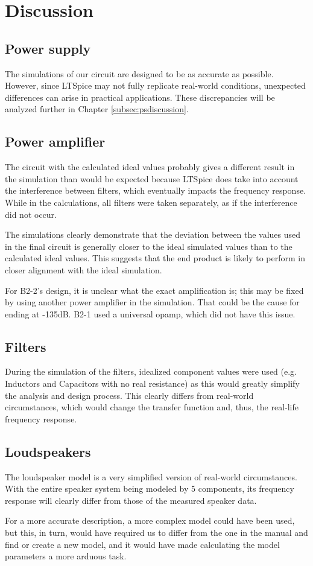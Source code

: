 \section{Discussion}

\subsection{Power supply}
The simulations of our circuit are designed to be as accurate as possible. However, since LTSpice may not fully replicate real-world conditions, unexpected differences can arise in practical applications. These discrepancies will be analyzed further in Chapter \ref{subsec:psdiscussion}.


\subsection{Power amplifier}
The circuit with the calculated ideal values probably gives a different result in the simulation than would be expected because LTSpice does take into account the interference between filters, which eventually impacts the frequency response. While in the calculations, all filters were taken separately, as if the interference did not occur. 

The simulations clearly demonstrate that the deviation between the values used in the final circuit is generally closer to the ideal simulated values than to the calculated ideal values. This suggests that the end product is likely to perform in closer alignment with the ideal simulation.

For B2-2's design, it is unclear what the exact amplification is; this may be fixed by using another power amplifier in the simulation. That could be the cause for ending at -135dB. B2-1 used a universal opamp, which did not have this issue.
\subsection{Filters}
During the simulation of the filters, idealized component values were used (e.g. Inductors and Capacitors with no real resistance) as this would greatly simplify the analysis and design process. This clearly differs from real-world circumstances, which would change the transfer function and, thus, the real-life frequency response. 

\subsection{Loudspeakers}
The loudspeaker model is a very simplified version of real-world circumstances. With the entire speaker system being modeled by 5 components, its frequency response will clearly differ from those of the measured speaker data. 

For a more accurate description, a more complex model could have been used, but this, in turn, would have required us to differ from the one in the manual and find or create a new model, and it would have made calculating the model parameters a more arduous task. 